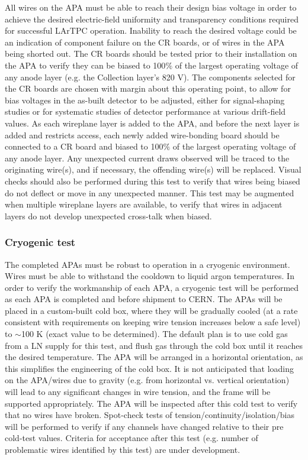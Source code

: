 All wires on the APA must be able to reach their design bias voltage in order to achieve the desired electric-field uniformity and transparency conditions required for successful LArTPC operation.  Inability to reach the desired voltage could be an indication of component failure on the CR boards, or of wires in the APA being shorted out.  The CR boards should be tested prior to their installation on the APA to verify they can be biased to 100$\%$ of the largest operating voltage of any anode layer (e.g. the Collection layer's 820 V).  The components selected for the CR boards are chosen with margin about this operating point, to allow for bias voltages in the as-built detector to be adjusted, either for signal-shaping studies or for systematic studies of detector performance at various drift-field values.  As each wireplane layer is added to the APA, and before the next layer is added and restricts access, each newly added wire-bonding board should be connected to a CR board and biased to 100$\%$ of the largest operating voltage of any anode layer.  Any unexpected current draws observed will be traced to the originating wire(s), and if necessary, the offending wire(s) will be replaced.  Visual checks should also be performed during this test to verify that wires being biased do not deflect or move in any unexpected manner.  This test may be augmented when multiple wireplane layers are available, to verify that wires in adjacent layers do not develop unexpected cross-talk when biased.

\subsubsection{Cryogenic test}

The completed APAs must be robust to operation in a cryogenic environment.  Wires must be able to withstand the cooldown to liquid argon temperatures.  In order to verify the workmanship of each APA, a cryogenic test will be performed as each APA is completed and before shipment to CERN.  The APAs will be placed in a custom-built cold box, where they will be gradually cooled (at a rate consistent with requirements on keeping wire tension increases below a safe level) to $\sim$100 K (exact value to be determined).  The default plan is to use cold gas from a LN supply for this test, and flush gas through the cold box until it reaches the desired temperature.  The APA will be arranged in a horizontal orientation, as this simplifies the engineering of the cold box.  It is not anticipated that loading on the APA/wires due to gravity (e.g. from horizontal vs. vertical orientation) will lead to any significant changes in wire tension, and the frame will be supported appropriately.  The APA will be inspected after this cold test to verify that no wires have broken.  Spot-check tests of tension/continuity/isolation/bias will be performed to verify if any channels have changed relative to their pre cold-test values.  Criteria for acceptance after this test (e.g. number of problematic wires identified by this test) are under development.

